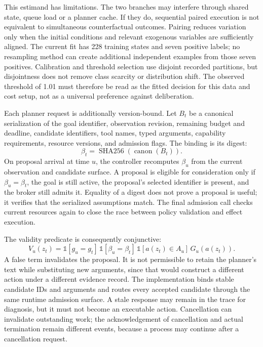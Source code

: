 \documentclass[11pt]{article}
\begin{document}
This estimand has limitations. The two branches may interfere through shared state, queue load or a planner cache. If they do, sequential paired execution is not equivalent to simultaneous counterfactual outcomes. Pairing reduces variation only when the initial conditions and relevant exogenous variables are sufficiently aligned. The current fit has 228 training states and seven positive labels; no resampling method can create additional independent examples from those seven positives. Calibration and threshold selection use disjoint recorded partitions, but disjointness does not remove class scarcity or distribution shift. The observed threshold of 1.01 must therefore be read as the fitted decision for this data and cost setup, not as a universal preference against deliberation.

Each planner request is additionally version-bound. Let $B_t$ be a canonical serialization of the goal identifier, observation revision, remaining budget and deadline, candidate identifiers, tool names, typed arguments, capability requirements, resource versions, and admission flags. The binding is its digest:
\begin{equation}
\beta_t=\operatorname{SHA256}(\operatorname{canon}(B_t)).
\end{equation}
On proposal arrival at time $u$, the controller recomputes $\beta_u$ from the current observation and candidate surface. A proposal is eligible for consideration only if $\beta_u=\beta_t$, the goal is still active, the proposal's selected identifier is present, and the broker still admits it. Equality of a digest does not prove a proposal is useful; it verifies that the serialized assumptions match. The final admission call checks current resources again to close the race between policy validation and effect execution.

The validity predicate is consequently conjunctive:
\begin{equation}
V_u(z_t)=\mathbb{1}[g_u=g_t]\,\mathbb{1}[\beta_u=\beta_t]\,\mathbb{1}[a(z_t)\in A_u]\,G_u(a(z_t)).
\end{equation}
A false term invalidates the proposal. It is not permissible to retain the planner's text while substituting new arguments, since that would construct a different action under a different evidence record. The implementation binds stable candidate IDs and arguments and routes every accepted candidate through the same runtime admission surface. A stale response may remain in the trace for diagnosis, but it must not become an executable action. Cancellation can invalidate outstanding work; the acknowledgement of cancellation and actual termination remain different events, because a process may continue after a cancellation request.
\end{document}
